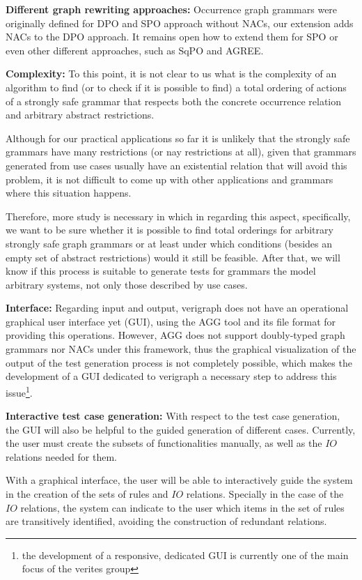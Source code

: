 \textbf{Different graph rewriting approaches:} Occurrence graph grammars were originally defined for DPO and SPO approach without NACs, our extension adds NACs to the DPO approach. It remains open how to extend them for SPO or even other different approaches, such as SqPO and AGREE.

\textbf{Complexity:} To this point, it is not clear to us what is the complexity of an algorithm to find (or to check if it is possible to find) a total ordering of actions of a strongly safe grammar that respects both the concrete occurrence relation and arbitrary abstract restrictions.

  Although for our practical applications so far it is unlikely that the strongly safe grammars have many restrictions (or nay restrictions at all), given that grammars generated from use cases usually have an existential relation that will avoid this problem, it is not difficult to come up with other applications and grammars where this situation happens.

  Therefore, more study is necessary in which in regarding this aspect, specifically, we want to be sure whether it is possible to find total orderings for arbitrary strongly safe graph grammars or at least under which conditions (besides an empty set of abstract restrictions) would it still be feasible. After that, we will know if this process is suitable to generate tests for grammars the model arbitrary systems, not only those described by use cases.


\textbf{Interface:} Regarding input and output, verigraph does not have an operational graphical user interface yet (GUI), using the AGG tool and its  file format for providing this operations. However, AGG does not support doubly-typed graph grammars nor NACs under this framework, thus the graphical visualization of the output of the test generation process is not completely possible, which makes the development of a GUI dedicated to verigraph a necessary step to address this issue\footnote{the development
  of a responsive, dedicated GUI is currently one of the main focus of the verites group}.

\textbf{Interactive test case generation:} With respect to the test case generation, the GUI will also be helpful to the guided generation of different cases. Currently, the user must create the subsets of functionalities manually, as well as the $IO$ relations needed for them.

With a graphical interface, the user will be able to interactively guide the system in the creation of the sets of rules and $IO$ relations. Specially in the case of the $IO$ relations, the system can indicate to the user which items in the set of rules are transitively identified, avoiding the construction of redundant relations.

